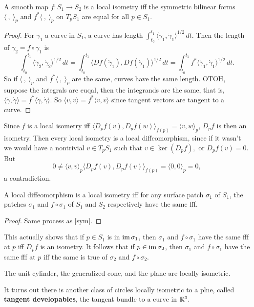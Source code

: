 \begin{theorem}\label{sym} 
    A smooth map $f \colon S_1 \to S_2$ is a local isometry iff the symmetric bilinear forms $\langle \ , \ \rangle _p $ and $f^*\langle \ ,\ \rangle _p$ on $T_p S_1$ are equal for all $p \in S_1$.
\end{theorem}
\begin{proof}
    For $\gamma _1$ a curve in $S_1$, a curve has length $\int_{t_0}^{t_1} \langle \dot \gamma_1,\dot \gamma_1   \rangle ^{1 /2} \, dt$. Then the length of $\gamma_2=f \circ \gamma_1 $ is \[
        \int_{t_0}^{t_1} \langle \dot \gamma_2,\dot \gamma_2   \rangle ^{1 /2} \, dt=\int_{t_0}^{t_1} \langle Df(\dot \gamma_1),Df(\dot \gamma_1)   \rangle ^{1 /2} \, dt=\int_{t_0}^{t_1} f^*\langle \dot \gamma_1,\dot \gamma_1   \rangle ^{1 /2} \, dt.
    \] So if $\langle \ ,\ \rangle _p$ and $f^*\langle \ ,\ \rangle _p$ are the same, curves have the same length. OTOH, suppose the integrals are euqal, then the integrands are the same, that is, $\langle \dot \gamma ,\dot \gamma  \rangle =f^*\langle \dot \gamma ,\dot \gamma  \rangle $. So $\langle v,v \rangle =f^*\langle v,v \rangle $ since tangent vectors are tangent to a curve. 
\end{proof}
Since $f$ is a local isometry iff $\langle D_p f(v) , D_pf(w)\rangle _{f(p)}=\langle v,w \rangle _p$, $D_p f$ is then an isometry. Then every local isometry is a local diffeomorphism, since if it wasn't we would have a nontrivial $v \in T_p S_1$ such that $v \in \ker (D_p f),$ or $D_pf(v)=0$. But  \[
    0\neq \langle v,v \rangle _p \langle D_p f(v),D_pf(v) \rangle _{f(p)}=\langle 0,0 \rangle _p=0,
\] a contradiction.
\begin{cor}
    A local diffeomorphism is a local isometry iff for any surface patch $\sigma_1$ of $S_1$, the patches $\sigma_1$ and $f \circ \sigma_1$ of $S_1$ and $S_2$ respectively have the same fff.
\end{cor}
\begin{proof}
    Same process as \cref{sym}.
\end{proof}
This actually shows that if $p \in  S_1$ is in $\operatorname{im} \sigma_1$, then $\sigma_1$ and $f \circ \sigma_1$ have the same fff at $p$ iff $D_p f$ is an isometry. It follows that if $p \in \operatorname{im} \sigma_2$, then $\sigma_1$ and $f \circ \sigma_1$ have the same fff at $p$ iff the same is true of $\sigma_2$ and $f \circ \sigma_2$.
\begin{example}
    The unit cylinder, the generalized cone, and the plane are locally isometric.
\end{example}
It turns out there is another class of circles locally isometric to a plne, called \textbf{tangent developables}, the tangent bundle to a curve in $\mathbb{R}^3$.

